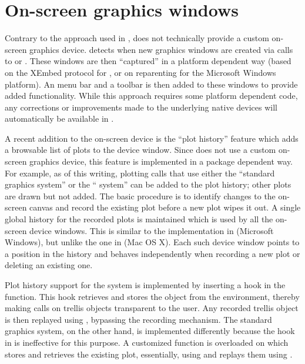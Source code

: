 \section{On-screen graphics windows}
\label{sec:technical_graphics}
Contrary to the approach used in  \citep{JGR2010},  does
not technically provide a custom on-screen graphics device.  detects when
new graphics windows are created via calls to  or . These windows
are then ``captured'' in a platform dependent way (based on the XEmbed \citep{Ettrich2002} protocol
for , or on reparenting for the Microsoft Windows platform). An  menu bar and a
toolbar is then added to these windows to provide added functionality. While
this approach requires some platform dependent code, any corrections or
improvements made to the underlying  native devices will automatically be
available in .

A recent addition to the on-screen device is the ``plot history'' feature which
adds a browsable list of plots to the device window. Since  does not use a
custom on-screen graphics device, this feature is implemented in a package
dependent way. For example, as of this writing, plotting calls that use either
the ``standard graphics system'' or the `` system'' can be added to the plot
history; other plots are drawn but not added. The basic procedure is to identify
changes to the on-screen canvas and record the existing plot before a new plot
wipes it out. A single global history for the recorded plots is maintained
which is used by all the on-screen device windows. This is similar to the
implementation in  (Microsoft Windows), but unlike the one in  
(Mac OS X). Each such device window points to a position in the history
and behaves independently when recording a new plot or deleting an existing
one.

Plot history support for the
 system \citep{Sarkar2008} is implemented by inserting a hook in the 
function. This hook retrieves and stores the  object from the
 environment, thereby making  calls on trellis
objects transparent to the user. Any recorded trellis object is then replayed
using , bypassing the recording mechanism. The standard graphics
system, on the other hand, is implemented differently because the hook in
 is ineffective for this purpose. A customized function is overloaded
on  which stores and retrieves the existing plot, essentially, using
 and replays them using .

